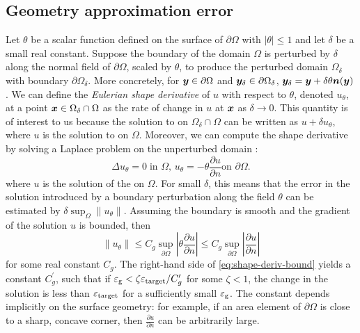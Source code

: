 \subsection{Geometry approximation error\label{sec:error_geom}}
Let $\theta$ be a scalar function defined on the surface of $\partial \Omega$ with $|\theta| \leq 1$ and let $\delta$ be a small real constant.
Suppose the boundary of the domain $\Omega$ is perturbed by $\delta$ along the normal field of $\partial\Omega$, scaled by $\theta$, to produce the perturbed domain $\Omega_\delta$ with boundary $\partial \Omega_\delta$.
More concretely, for ${\bm{y}} \in \partial\Omega$ and ${\bm{y}}_\delta\in \partial \Omega_\delta$, ${\bm{y}}_\delta= {\bm{y}} + \delta\theta{\bm{n}}({\bm{y}})$.
We can define the \textit{Eulerian shape derivative} of $u$ with respect to $\theta$, denoted $u_\theta$, at a point ${\bm{x}} \in \Omega_\delta \cap \Omega$ as the rate of change in $u$ at ${\bm{x}}$ as $\delta \rightarrow 0$.
This quantity is of interest to us because the solution to \cite[Equation 2]{morse2020robust} on $\Omega_\delta \cap \Omega$ can be written as $u + \delta u_\theta$, where $u$ is the solution to \cite[Equation 2]{morse2020robust} on $\Omega$.
Moreover, we can compute the shape derivative by solving a Laplace problem on the unperturbed domain \cite{pironneau1982optimal}:
\begin{equation}
\Delta u_\theta= 0\;\mbox{in $\Omega$, } u_\theta = -  \theta \frac{\partial u}{\partial n} \mbox{on $\partial\Omega$.}
\label{eq:shape-deriv}
\end{equation}  
where $u$ is the solution of the \cite[Equation 2]{morse2020robust} on $\Omega$.
For small $\delta$, this means that the error in the solution introduced by a boundary perturbation along the field $\theta$ can be estimated by  $\delta \sup_{\Omega} \| u_\theta \|$.
Assuming the boundary is smooth and the gradient of the solution $u$ is bounded, then
\begin{equation}
\| u_\theta \| \leq C_g \sup_{\partial\Omega} \left| \theta  \frac{\partial u}{\partial n} \right| \leq
C_g \sup_{\partial\Omega} \left| \frac{\partial u}{\partial n}\right|
\label{eq:shape-deriv-bound}
\end{equation}
for some real constant $C_g$.
The right-hand side of \cref{eq:shape-deriv-bound} yields a constant $C_g^\prime$, such that if ${\varepsilon_{\mathrm{g}}} <  \zeta{\varepsilon_{\ensuremath{\mathrm{target}}}}/C_g^\prime$ for some $\zeta < 1$,  the change in the solution is less than ${\varepsilon_{\mathrm{target}}}$ for a sufficiently small ${\varepsilon_{\mathrm{g}}}$.
The constant depends implicitly on the surface geometry: for example, if an area element of $\partial\Omega$ is close to a sharp, concave corner, then  $\frac{\partial u}{\partial n}$ can be arbitrarily large. 


